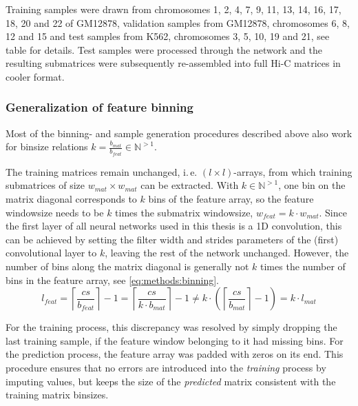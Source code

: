 Training samples were drawn from chromosomes 1, 2, 4, 7, 9, 11, 13, 14, 16, 17, 18, 20 and 22 of GM12878, 
validation samples from GM12878, chromosomes 6, 8, 12 and 15 and test samples from K562, chromosomes 3, 5, 10, 19 and 21,
see table \xxx for details.
Test samples were processed through the network and the resulting submatrices were subsequently re-assembled into full Hi-C matrices in cooler format.

\subsubsection{Generalization of feature binning} \label{sec:methods:inputBinning}
Most of the binning- and sample generation procedures described above 
also work for binsize relations $k=\frac{b_{mat}}{b_{feat}} \in \mathbb{N}^{>1}$.

The training matrices remain unchanged, i.\,e. $(l \times l)$-arrays, from which training submatrices of size  $w_{mat} \times w_{mat} $
can be extracted. 
With $k \in \mathbb{N}^{>1}$, one bin on the matrix diagonal corresponds to $k$ bins of the feature array,
so the feature windowsize needs to be $k$ times the submatrix windowsize, $w_{feat} = k \cdot w_{mat}$.
Since the first layer of all neural networks used in this thesis is a 1D convolution,
this can be achieved by setting the filter width and strides parameters of the (first) convolutional layer to $k$, leaving the rest of the network unchanged.
However, the number of bins along the matrix diagonal is generally not $k$ times the number of bins in the feature array,
see \cref{eq:methods:binning}.
\begin{equation}
 l_{feat} = \left \lceil{\frac{cs}{b_{feat}}}\right \rceil -1 
                = \left \lceil{\frac{cs}{k \cdot b_{mat}}}\right \rceil -1 
                \not = k \cdot (\left \lceil{\frac{cs}{ b_{mat}}}\right \rceil -1)
                = k \cdot l_{mat} \label{eq:methods:binning}
\end{equation}

For the training process, this discrepancy was resolved by simply dropping the last training sample, 
if the feature window belonging to it had missing bins.
For the prediction process, the feature array was padded with zeros on its end.
This procedure ensures that no errors are introduced into the \emph{training} process by imputing values,
but keeps the size of the \emph{predicted} matrix consistent with the training matrix binsizes.

